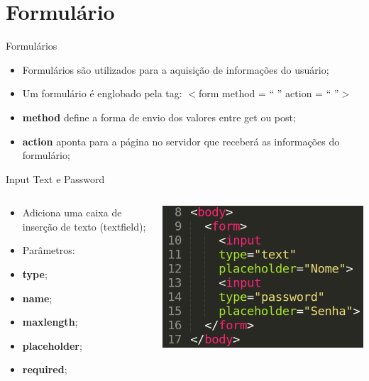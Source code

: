 \documentclass{beamer}
\begin{document}
\section{Formulário}
\begin{frame}{Formulários}
  \begin{itemize}
    \item Formulários são utilizados para a aquisição de informações do 
usuário;
      \item Um formulário é englobado pela tag: $<$form method = `` ''
action = `` ''$>$
     \item \textbf{method} define a forma de envio dos valores entre get 
ou post;
 \item \textbf{action} aponta para a página no servidor que receberá 
as informações do formulário;
\end{itemize}
\end{frame}
\begin{frame}{Input}
  Text e Password
    \begin{columns}
    \begin{column}{0.4 \textwidth}
      \small
     \begin{itemize}
       \item Adiciona uma caixa de inserção de texto (textfield);
        \item Parâmetros:
        \item \textbf{type};
        \item \textbf{name};
        \item \textbf{maxlength};
        \item \textbf{placeholder};
        \item \textbf{required};
     \end{itemize}
    \end{column}
    
    \begin{column}{0.5\textwidth}
     \includegraphics[height=0.45\paperheight]{fig/aula3/aula4_7.png}
    \end{column}
  \end{columns}
\end{frame}
\end{document}
